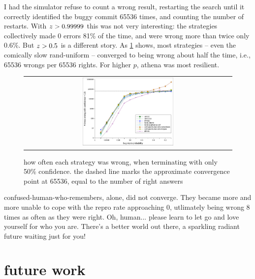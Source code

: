 \documentclass[11pt]{sigplanconf}
\begin{document}
I had the simulator refuse to count a wrong result, %
restarting the search until it correctly identified the buggy commit 65536 times,
and counting the number of restarts.
With $z > 0.99999$ this was not very interesting:
the strategies collectively made 0 errors 81\% of the time, and were wrong more than twice only 0.6\%.
But $z > 0.5$ is a different story.
As \cref{fig:wrongs} shows, most strategies
-- even the comically slow {\sf rand-uniform} --
converged to being wrong about half the time, i.e., 65536 wrongs per 65536 rights.
For higher $p$,
{\sf athena} was most resilient.

\begin{figure}[t]
	\begin{tabular}{c}
		\includegraphics[width=0.45\textwidth]{wrongs.pdf}
	\end{tabular}
	\caption{how often each strategy was wrong, when terminating with only 50\% confidence.
	the dashed line marks the approximate convergence point at 65536, equal to the number of right answers}
	\label{fig:wrongs}
\end{figure}

{\sf confused-human-who-remembers}, alone, did not converge.
They became more and more unable to cope with the repro rate approaching 0,
utlimately being wrong 8 times as often as they were right.
Oh, human... please learn to let go and love yourself for who you are.
There's a better world out there, a sparkling radiant future waiting just for you!


\section{future work}
\end{document}
